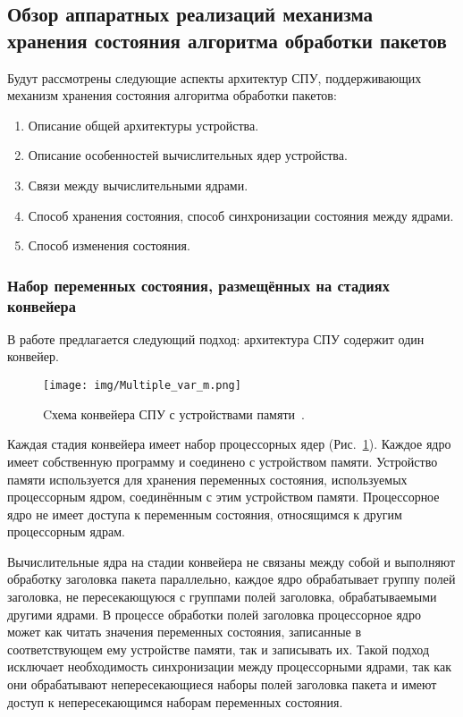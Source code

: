 \documentclass[conference]{IEEEtran}
\begin{document}
\subsection{Обзор аппаратных реализаций механизма хранения состояния алгоритма
обработки пакетов}

Будут рассмотрены следующие аспекты архитектур СПУ, поддерживающих
механизм хранения состояния алгоритма обработки пакетов:
\begin{enumerate}
	\item Описание общей архитектуры устройства.
	\item Описание особенностей вычислительных ядер устройства.
	\item Связи между вычислительными ядрами.
	\item Способ хранения состояния, способ синхронизации состояния между
		ядрами.
	\item Способ изменения состояния.
\end{enumerate}

\subsubsection{Набор переменных состояния, размещённых на стадиях конвейера}
В работе \cite{bib:Sivaraman:patent} предлагается следующий подход:
архитектура СПУ содержит один конвейер.

\begin{figure}
	\centering
	\texttt{[image: img/Multiple\_var\_m.png]}
	\caption{Cхема конвейера СПУ с устройствами
	памяти~\cite{bib:Sivaraman:patent}.}
	\label{float:app:pipeline}
\end{figure}

Каждая стадия конвейера имеет набор процессорных ядер
(Рис.~\ref{float:app:pipeline}). Каждое ядро имеет собственную программу и
соединено с устройством памяти. Устройство памяти
используется для хранения переменных состояния, используемых процессорным
ядром, соединённым с этим устройством памяти. Процессорное ядро
не имеет доступа к переменным состояния, относящимся к другим процессорным
ядрам.

Вычислительные ядра на стадии конвейера не связаны между собой и выполняют
обработку заголовка пакета параллельно, каждое ядро обрабатывает
группу полей заголовка, не пересекающуюся с группами полей заголовка,
обрабатываемыми другими ядрами. В процессе обработки полей заголовка
процессорное ядро может как читать значения переменных состояния,
записанные в соответствующем ему устройстве памяти, так и записывать их.
Такой подход исключает необходимость синхронизации между процессорными
ядрами, так как они обрабатывают непересекающиеся наборы полей заголовка
пакета и имеют доступ к непересекающимся наборам переменных состояния.
\end{document}
